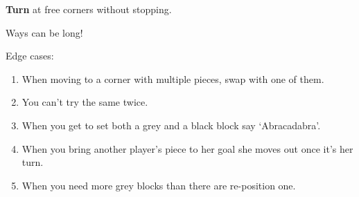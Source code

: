     \textbf{Turn} at free corners without stopping. 

    Ways can be long!
    
    

  

    \skipper

\raggedright

\vspace{5ex}

Edge cases:

    \begin{enumerate}
        \item When moving to a corner with multiple pieces, swap with one of them.
        \item You can't try the same twice.
        \item When you get to set both a grey and a black block say `Abracadabra'.
        \item When you bring another player's piece to her goal she moves out once it's her turn.
        \item When you need more grey blocks than there are re-position one.
    \end{enumerate}

\hrulefill






